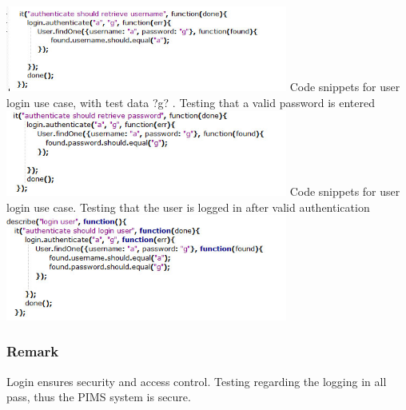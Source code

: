 \includegraphics[width=350px]{./TestingDoc/Graphics/usernameTest}
\newline 
\newline 
Code snippets for user login use case, with test data ?g?  . Testing that a valid password is entered
\newline 
\newline
\includegraphics[width=350px]{./TestingDoc/Graphics/passwordTest}
\newline 
\newline
Code snippets for user login use case. Testing that the user is logged in after valid authentication
\newline 
\newline
\includegraphics[width=350px]{./TestingDoc/Graphics/UserMustLogIn}

\subsubsection*{Remark}
Login ensures security and access control. Testing regarding the logging in all pass, thus the PIMS system is secure.